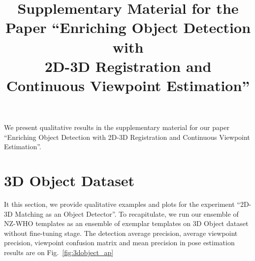\documentclass[10pt,twocolumn,letterpaper]{article}
\begin{document}
\title{Supplementary Material for the Paper ``Enriching Object Detection with\\2D-3D Registration and Continuous Viewpoint Estimation''}


\maketitle

We present qualitative results in the supplementary material for our paper
``Enriching Object Detection with 2D-3D Registration and Continuous Viewpoint
Estimation''.

\section{3D Object Dataset}
\label{sect:3dobject}

It this section, we provide qualitative examples and plots for the experiment
``2D-3D Matching as an Object Detector''. To recapitulate, we run our ensemble
of NZ-WHO templates as an ensemble of exemplar templates on 3D Object
dataset\cite{savarese07} without fine-tuning stage. The detection average
precision, average viewpoint precision, viewpoint confusion matrix and mean
precision in pose estimation results are on Fig.~\ref{fig:3dobject_ap}
\end{document}
